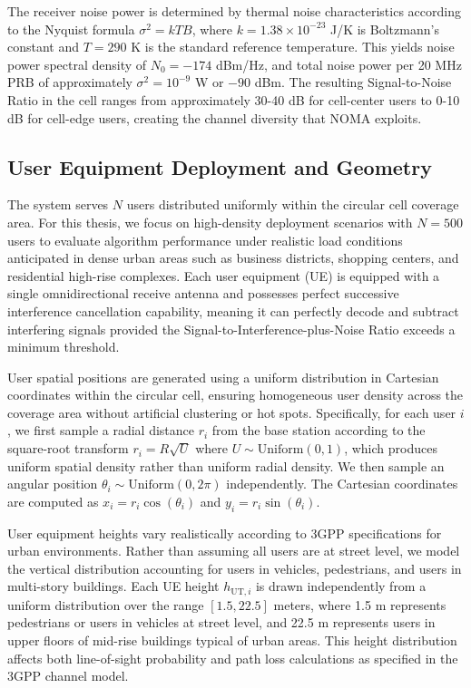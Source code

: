 The receiver noise power is determined by thermal noise characteristics according to the Nyquist formula $\sigma^2 = kTB$, where $k = 1.38 \times 10^{-23}$ J/K is Boltzmann's constant and $T = 290$ K is the standard reference temperature. This yields noise power spectral density of $N_0 = -174$ dBm/Hz, and total noise power per 20 MHz PRB of approximately $\sigma^2 = 10^{-9}$ W or $-90$ dBm. The resulting Signal-to-Noise Ratio in the cell ranges from approximately 30-40 dB for cell-center users to 0-10 dB for cell-edge users, creating the channel diversity that NOMA exploits.

\subsection{User Equipment Deployment and Geometry}

The system serves $N$ users distributed uniformly within the circular cell coverage area. For this thesis, we focus on high-density deployment scenarios with $N = 500$ users to evaluate algorithm performance under realistic load conditions anticipated in dense urban areas such as business districts, shopping centers, and residential high-rise complexes. Each user equipment (UE) is equipped with a single omnidirectional receive antenna and possesses perfect successive interference cancellation capability, meaning it can perfectly decode and subtract interfering signals provided the Signal-to-Interference-plus-Noise Ratio exceeds a minimum threshold.

User spatial positions are generated using a uniform distribution in Cartesian coordinates within the circular cell, ensuring homogeneous user density across the coverage area without artificial clustering or hot spots. Specifically, for each user $i$, we first sample a radial distance $r_i$ from the base station according to the square-root transform $r_i = R \sqrt{U}$ where $U \sim \text{Uniform}(0,1)$, which produces uniform spatial density rather than uniform radial density. We then sample an angular position $\theta_i \sim \text{Uniform}(0, 2\pi)$ independently. The Cartesian coordinates are computed as $x_i = r_i \cos(\theta_i)$ and $y_i = r_i \sin(\theta_i)$.

User equipment heights vary realistically according to 3GPP specifications for urban environments. Rather than assuming all users are at street level, we model the vertical distribution accounting for users in vehicles, pedestrians, and users in multi-story buildings. Each UE height $h_{\text{UT},i}$ is drawn independently from a uniform distribution over the range $[1.5, 22.5]$ meters, where 1.5 m represents pedestrians or users in vehicles at street level, and 22.5 m represents users in upper floors of mid-rise buildings typical of urban areas. This height distribution affects both line-of-sight probability and path loss calculations as specified in the 3GPP channel model.

